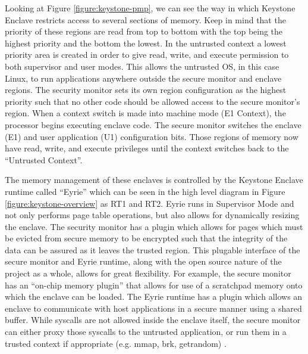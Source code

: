 Looking at Figure \ref{figure:keystone-pmp}, we can see the way in which Keystone Enclave restricts access to several sections of memory. Keep in mind that the priority of these regions are read from top to bottom with the top being the highest priority and the bottom the lowest. In the untrusted context a lowest priority area is created in order to give read, write, and execute permission to both supervisor and user modes. This allows the untrusted OS, in this case Linux, to run applications anywhere outside the secure monitor and enclave regions. The security monitor sets its own region configuration as the highest priority such that no other code should be allowed access to the secure monitor's region. When a context switch is made into machine mode (E1 Context), the processor begins executing enclave code. The secure monitor switches the enclave (E1) and user application (U1) configuration bits. Those regions of memory now have read, write, and execute privileges until the context switches back to the ``Untrusted Context''. 

The memory management of these enclaves is controlled by the Keystone Enclave runtime called ``Eyrie'' which can be seen in the high level diagram in Figure \ref{figure:keystone-overview} as RT1 and RT2. Eyrie runs in Supervisor Mode and not only performs page table operations, but also allows for dynamically resizing the enclave. The security monitor has a plugin which allows for pages which must be evicted from secure memory to be encrypted such that the integrity of the data can be assured as it leaves the trusted region. This plugable interface of the secure monitor and Eyrie runtime, along with the open source nature of the project as a whole, allows for great flexibility. For example, the secure monitor has an ``on-chip memory plugin'' \cite{lee2019keystone} that allows for use of a scratchpad memory onto which the enclave can be loaded. The Eyrie runtime has a plugin which allows an enclave to communicate with host applications in a secure manner using a shared buffer. While syscalls are not allowed inside the enclave itself, the secure monitor can either proxy those syscalls to the untrusted application, or run them in a trusted context if appropriate (e.g. mmap, brk, getrandom) \cite{lee2019keystone}.


